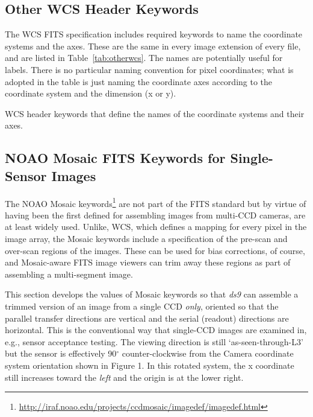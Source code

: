\documentclass{article}[12pt]
\begin{document}
\subsection{Other WCS Header Keywords \label{sec:coords_ifl}}

The WCS FITS specification includes required keywords to name the coordinate systems and the axes.  These are the same in every image extension of every file, and are listed in Table~\ref{tab:otherwcs}.  The names are potentially useful for labels.  There is no particular naming convention for pixel coordinates; what is adopted in the table is just naming the coordinate axes according to the coordinate system and the dimension (x or y).

\begin{table}
\begin{alltt}

\end{alltt}
\caption{WCS header keywords that define the names of the coordinate systems and their axes.\label{tab:otherwcs}}
\end{table}

\subsection{NOAO Mosaic FITS Keywords for Single-Sensor Images\label{sec:mosaic}}

The NOAO Mosaic keywords\footnote{\url{http://iraf.noao.edu/projects/ccdmosaic/imagedef/imagedef.html}} are not part of the FITS standard but by virtue of having been the first defined for assembling images from multi-CCD cameras, are at least widely used.  Unlike, WCS, which defines a mapping for every pixel in the image array, the Mosaic keywords include a specification of the pre-scan and over-scan regions of the images.  These can be used for bias corrections, of course, and Mosaic-aware FITS image viewers can trim away these regions as part of assembling a multi-segment image.

This section develops the values of Mosaic keywords so that {\it ds9} can assemble a trimmed version of an image from a single CCD {\it only}, oriented so that the parallel transfer directions are vertical and the serial (readout) directions are horizontal.  This is the conventional way that single-CCD images are examined in, e.g., sensor acceptance testing.  The viewing direction is still `as-seen-through-L3' but the sensor is effectively 90$^\circ$ counter-clockwise from the Camera coordinate system orientation shown in Figure 1.  In this rotated system, the x coordinate still increases toward the {\it left} and the origin is at the lower right.
\end{document}
